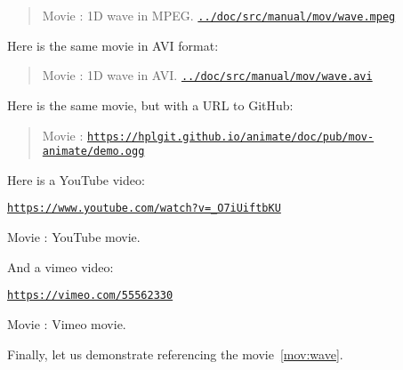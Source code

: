 \documentclass[%
oneside,                 %
final,                   %
10pt]{article}
\newenvironment{doconce:movie}{}{}
\newcounter{doconce:movie:counter}
\begin{document}
\begin{center}
\begin{Sbox}
\begin{minipage}{0.85\linewidth}
\begin{doconce:movie}
\begin{quote}
Movie : 1D wave in MPEG. \label{mov:wave} \href{run:../doc/src/manual/mov/wave.mpeg}{\nolinkurl{../doc/src/manual/mov/wave.mpeg}}
\end{quote}
\end{doconce:movie}
\end{minipage}
\end{Sbox}
\fbox{\TheSbox}
\end{center}
Here is the same movie in AVI format:
\begin{doconce:movie}
\begin{quote}
Movie : 1D wave in AVI. \href{run:../doc/src/manual/mov/wave.avi}{\nolinkurl{../doc/src/manual/mov/wave.avi}}
\end{quote}
\end{doconce:movie}
Here is the same movie, but with a URL to GitHub:
\begin{doconce:movie}
\begin{quote}
Movie :  \href{https://hplgit.github.io/animate/doc/pub/mov-animate/demo.ogg}{\nolinkurl{https://hplgit.github.io/animate/doc/pub/mov-animate/demo.ogg}}
\end{quote}
\end{doconce:movie}
Here is a YouTube video:
\begin{doconce:movie}
\begin{center}
\href{{https://www.youtube.com/watch?v=_O7iUiftbKU}}{\nolinkurl{https://www.youtube.com/watch?v=_O7iUiftbKU}}
\end{center}
\begin{center}  %
Movie : YouTube movie.
\end{center}
\end{doconce:movie}
And a vimeo video:
\begin{doconce:movie}
\begin{center}\href{{https://vimeo.com/55562330}}{\nolinkurl{https://vimeo.com/55562330}}\end{center}
\begin{center}  %
Movie : Vimeo movie.
\end{center}
\end{doconce:movie}
Finally, let us demonstrate referencing the movie~\ref{mov:wave}.
\end{document}
